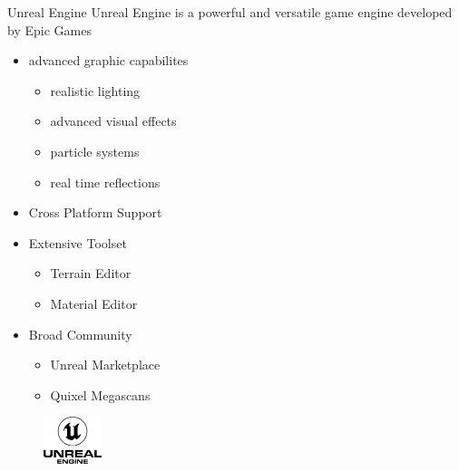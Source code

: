 \documentclass[11pt,t,usepdftitle=false,aspectratio=169]{beamer}
\begin{document}
\begin{frame}{Unreal Engine}
   Unreal Engine is a powerful and versatile game engine developed by Epic Games
   
   \begin{multicols}{2}
      \begin{itemize}
         \item advanced graphic capabilites
         \begin{itemize}
            \item realistic lighting
            \item advanced visual effects
            \item particle systems
            \item real time reflections
         \end{itemize}
         \item Cross Platform Support
         \item Extensive Toolset
         \begin{itemize}
            \item Terrain Editor
            \item Material Editor
         \end{itemize}
         \item Broad Community
         \begin{itemize}
            \item Unreal Marketplace
            \item Quixel Megascans
         \end{itemize}
      \end{itemize}
   \end{multicols}

   \begin{figure}
      \includegraphics[width=0.15\textwidth]{images/unreal_logo.png}
   \end{figure}
\end{frame}
\end{document}
